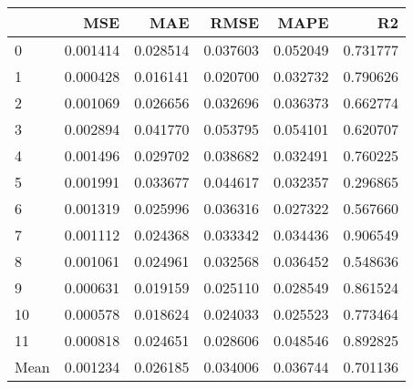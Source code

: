 \begin{tabular}{lrrrrr}
\toprule
 & MSE & MAE & RMSE & MAPE & R2 \\
\midrule
0 & 0.001414 & 0.028514 & 0.037603 & 0.052049 & 0.731777 \\
1 & 0.000428 & 0.016141 & 0.020700 & 0.032732 & 0.790626 \\
2 & 0.001069 & 0.026656 & 0.032696 & 0.036373 & 0.662774 \\
3 & 0.002894 & 0.041770 & 0.053795 & 0.054101 & 0.620707 \\
4 & 0.001496 & 0.029702 & 0.038682 & 0.032491 & 0.760225 \\
5 & 0.001991 & 0.033677 & 0.044617 & 0.032357 & 0.296865 \\
6 & 0.001319 & 0.025996 & 0.036316 & 0.027322 & 0.567660 \\
7 & 0.001112 & 0.024368 & 0.033342 & 0.034436 & 0.906549 \\
8 & 0.001061 & 0.024961 & 0.032568 & 0.036452 & 0.548636 \\
9 & 0.000631 & 0.019159 & 0.025110 & 0.028549 & 0.861524 \\
10 & 0.000578 & 0.018624 & 0.024033 & 0.025523 & 0.773464 \\
11 & 0.000818 & 0.024651 & 0.028606 & 0.048546 & 0.892825 \\
Mean & 0.001234 & 0.026185 & 0.034006 & 0.036744 & 0.701136 \\
\bottomrule
\end{tabular}
